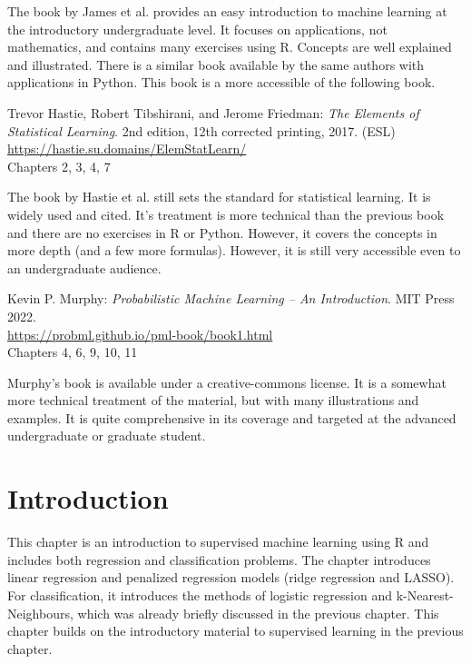 The book by James et al. provides an easy introduction to machine learning at the introductory undergraduate level. It focuses on applications, not mathematics, and contains many exercises using R. Concepts are well explained and illustrated. There is a similar book available by the same authors with applications in Python. This book is a more accessible of the following book.

\begin{tcolorbox}[colback=alert]
Trevor Hastie, Robert Tibshirani, and Jerome Friedman: \emph{The Elements of Statistical Learning}. 2nd edition, 12th corrected printing, 2017. (ESL) \\
\vspace{1mm}
\url{https://hastie.su.domains/ElemStatLearn/} \\
\vspace{1mm}
Chapters 2, 3, 4, 7
\end{tcolorbox}

The book by Hastie et al. still sets the standard for statistical learning. It is widely used and cited. It's treatment is more technical than the previous book and there are no exercises in R or Python. However, it covers the concepts in more depth (and a few more formulas). However, it is still very accessible even to an undergraduate audience.

\begin{tcolorbox}[colback=alert]
Kevin P. Murphy: \emph{Probabilistic Machine Learning -- An Introduction}. MIT Press 2022. \\
\vspace{1mm}
\url{https://probml.github.io/pml-book/book1.html} \\
\vspace{1mm}
Chapters 4, 6, 9, 10, 11
\end{tcolorbox}

Murphy's book is available under a creative-commons license. It is a somewhat more technical treatment of the material, but with many illustrations and examples. It is quite comprehensive in its coverage and targeted at the advanced undergraduate or graduate student. 

\section{Introduction}

This chapter is an introduction to supervised machine learning using R and includes both regression and classification problems. The chapter introduces linear regression and penalized regression models (ridge regression and LASSO). For classification, it introduces the methods of logistic regression and k-Nearest-Neighbours, which was already briefly discussed in the previous chapter. This chapter builds on the introductory material to supervised learning in the previous chapter. 

